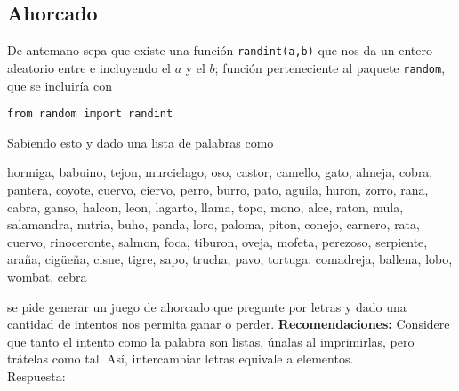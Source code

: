 \documentclass[11pt,twoside]{report}
\begin{document}
\subsection{Ahorcado}
De antemano sepa que existe una función \lstinline|randint(a,b)| que nos da un entero aleatorio entre e incluyendo el $a$ y el $b$; función perteneciente al paquete \lstinline|random|, que se incluiría con
\begin{lstlisting}
from random import randint
\end{lstlisting}
Sabiendo esto y dado una lista de palabras como
\begin{center}
hormiga, babuino, tejon, murcielago, oso, castor, camello, gato, almeja, cobra, pantera, coyote, cuervo, ciervo, perro, burro, pato, aguila, huron, zorro, rana, cabra, ganso, halcon, leon, lagarto, llama, topo, mono, alce, raton, mula, salamandra, nutria, buho, panda, loro, paloma, piton, conejo, carnero, rata, cuervo, rinoceronte, salmon, foca, tiburon, oveja, mofeta, perezoso, serpiente, araña, cigüeña, cisne, tigre, sapo, trucha, pavo, tortuga, comadreja, ballena, lobo, wombat, cebra
\end{center}
se pide generar un juego de ahorcado que pregunte por letras y dado una cantidad de intentos nos permita ganar o perder.
\textbf{Recomendaciones:} Considere que tanto el intento como la palabra son listas, únalas al imprimirlas, pero trátelas como tal. Así, intercambiar letras equivale a elementos.\\
{\sc Respuesta:}
\end{document}
